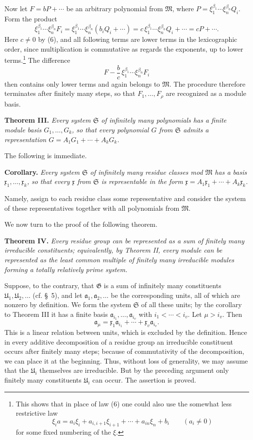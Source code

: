 \documentclass[11pt]{article}
\newcommand{\mM}{\mathfrak{M}}
\newcommand{\mG}{\mathfrak{G}}
\newcommand{\ma}{\mathfrak{a}}
\newcommand{\mx}{\mathfrak{x}}
\providecommand{\mU}{\mathfrak{U}}
\providecommand{\mS}{\mathfrak{S}}
\begin{document}
Now let $F=bP+\cdots$ be an arbitrary polynomial from $\mM$, where $P=\xi_1^{\beta_1}\cdots\xi_n^{\beta_n}Q_i$. Form the product
\[
 \xi_1^{\beta_1}\cdots\xi_n^{\beta_n}F_i
 =\xi_1^{\beta_1}\cdots\xi_n^{\beta_n}(b_iQ_i+\cdots)
 =c\,\xi_1^{\beta_1}\cdots\xi_n^{\beta_n}Q_i+\cdots
 =cP+\cdots.
\]
Here $c\ne0$ by (6), and all following terms are lower terms in the lexicographic order, since multiplication is commutative as regards the exponents, up to lower terms.\footnote{This shows that in place of law (6) one could also use the somewhat less restrictive law
\[
 \xi_i a=a_i\xi_i+a_{i,i+1}\xi_{i+1}+\cdots+a_{in}\xi_n+b_i\qquad(a_i\ne0)
\]
for some fixed numbering of the $\xi$.} The difference
\[
 F-\frac bc\,\xi_1^{\beta_1}\cdots\xi_n^{\beta_n}F_i
\]
then contains only lower terms and again belongs to $\mM$. The procedure therefore terminates after finitely many steps, so that $F_1,
\ldots,F_\rho$ are recognized as a module basis.

\textbf{Theorem III.} \emph{Every system $\mS$ of infinitely many polynomials has a finite module basis $G_1,
\ldots,G_k$, so that every polynomial $G$ from $\mS$ admits a representation $G=A_1G_1+
\cdots+A_kG_k$.}

The following is immediate.

\textbf{Corollary.} \emph{Every system $\mS$ of infinitely many residue classes mod $\mM$ has a basis $\mx_1,
\ldots,\mx_k$, so that every $\mx$ from $\mS$ is representable in the form $\mx=A_1\mx_1+
\cdots+A_k\mx_k$.}

Namely, assign to each residue class some representative and consider the system of these representatives together with all polynomials from $\mM$.

We now turn to the proof of the following theorem.

\textbf{Theorem IV.} \emph{Every residue group can be represented as a sum of finitely many irreducible constituents; equivalently, by Theorem II, every module can be represented as the least common multiple of finitely many irreducible modules forming a totally relatively prime system.}

Suppose, to the contrary, that $\mG$ is a sum of infinitely many constituents $\mU_1,\mU_2,
\ldots$ (cf. \S~5), and let $\ma_1,
\ma_2,
\ldots$ be the corresponding units, all of which are nonzero by definition. We form the system $\mS$ of all these units; by the corollary to Theorem III it has a finite basis $\ma_{i_1},
\ldots,\ma_{i_v}$ with $i_1<\cdots<i_v$. Let $\mu>i_v$. Then
\[
 \ma_\mu=\mx_1\ma_{i_1}+\cdots+\mx_v\ma_{i_v}.
\]
This is a linear relation between units, which is excluded by the definition. Hence in every additive decomposition of a residue group an irreducible constituent occurs after finitely many steps; because of commutativity of the decomposition, we can place it at the beginning. Thus, without loss of generality, we may assume that the $\mU_i$ themselves are irreducible. But by the preceding argument only finitely many constituents $\mU_i$ can occur. The assertion is proved.
\end{document}
